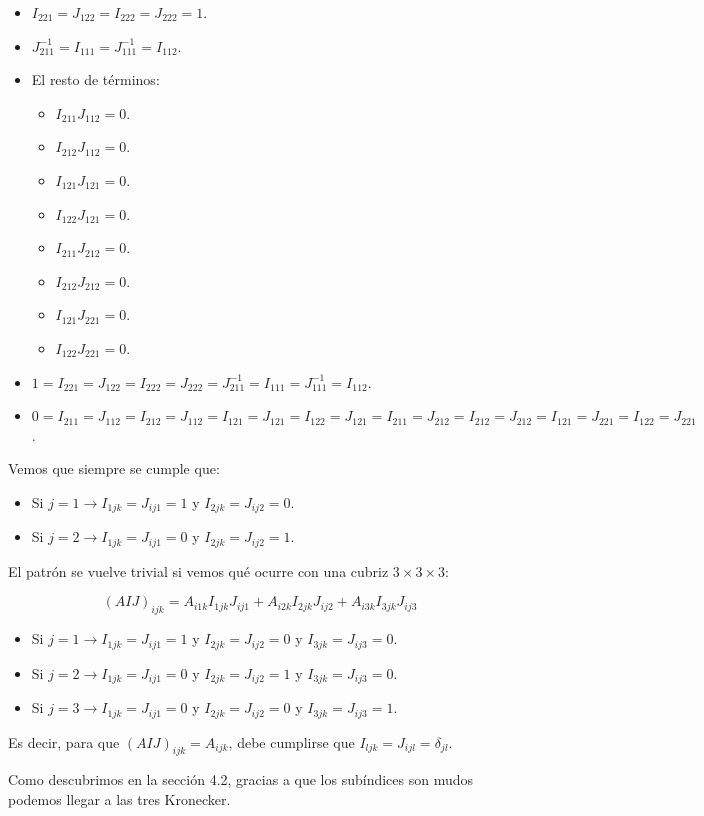 \documentclass[a4paper, titlepage]{article}
\begin{document}
\begin{itemize}
	\item $I_{221} = J_{122} = I_{222} = J_{222} = 1$.
	\item $J_{211}^{-1} = I_{111} = J_{111}^{-1} = I_{112}$.
	\item El resto de términos:

	\begin{itemize}
		\item $I_{211} J_{112} = 0$.
		\item $I_{212} J_{112} = 0$.
		\item $I_{121} J_{121} = 0$.
		\item $I_{122} J_{121} = 0$.
		\item $I_{211} J_{212} = 0$.
		\item $I_{212} J_{212} = 0$.
		\item $I_{121} J_{221} = 0$.
		\item $I_{122} J_{221} = 0$.
	\end{itemize}
\end{itemize}

\begin{itemize}
	\item $1 = I_{221} = J_{122} = I_{222} = J_{222} = J_{211}^{-1} = I_{111} = J_{111}^{-1} = I_{112}$.
	\item $0 = I_{211} = J_{112} = I_{212} = J_{112} = I_{121} = J_{121} = I_{122} = J_{121} = I_{211} = J_{212} = I_{212} = J_{212} = I_{121} = J_{221} = I_{122} = J_{221}$.
\end{itemize}

Vemos que siempre se cumple que:

\begin{itemize}
	\item Si $j = 1 \rightarrow I_{1jk} = J_{ij1} = 1$ y $I_{2jk} = J_{ij2} = 0$.
	\item Si $j = 2 \rightarrow I_{1jk} = J_{ij1} = 0$ y $I_{2jk} = J_{ij2} = 1$.
\end{itemize}

El patrón se vuelve trivial si vemos qué ocurre con una cubriz $3 \times 3 \times 3$:

$$(AIJ)_{ijk} = A_{i1k} I_{1jk} J_{ij1} + A_{i2k} I_{2jk} J_{ij2} + A_{i3k} I_{3jk} J_{ij3}$$

\begin{itemize}
	\item Si $j = 1 \rightarrow I_{1jk} = J_{ij1} = 1$ y $I_{2jk} = J_{ij2} = 0$ y $I_{3jk} = J_{ij3} = 0$.
	\item Si $j = 2 \rightarrow I_{1jk} = J_{ij1} = 0$ y $I_{2jk} = J_{ij2} = 1$ y $I_{3jk} = J_{ij3} = 0$.
	\item Si $j = 3 \rightarrow I_{1jk} = J_{ij1} = 0$ y $I_{2jk} = J_{ij2} = 0$ y $I_{3jk} = J_{ij3} = 1$.
\end{itemize}

Es decir, para que $(AIJ)_{ijk} = A_{ijk}$, debe cumplirse que $I_{ljk} = J_{ijl} = \delta_{jl}$.

Como descubrimos en la sección 4.2, gracias a que los subíndices son mudos podemos llegar a las tres Kronecker.
\end{document}
